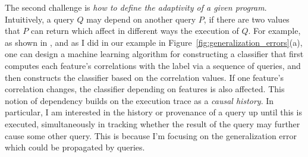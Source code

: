 \begin{enumerate}
The second challenge is \emph{how to define the adaptivity of a given program}.
Intuitively, a query $Q$ may depend on another query $P$, if there are two values that $P$ can return which affect in different ways the execution of $Q$. 
For example, as shown in \cite{dwork2015reusable}, and as I did in our example in Figure~\ref{fig:generalization_errors}(a), one can design a machine learning algorithm for constructing a classifier that first computes each feature's correlations with the label via a sequence of queries, and then constructs the classifier based on the correlation values. 
If one feature's correlation changes, the classifier depending on features is also affected. 
This notion of dependency builds on the execution trace as a \emph{causal history}. 
In particular, I am interested in the history or provenance of a query up until this is executed, 
simultaneously in tracking whether the result of the query may further cause some other query. 
This is because I'm focusing on the generalization error which could be propagated by queries.


\end{enumerate}
